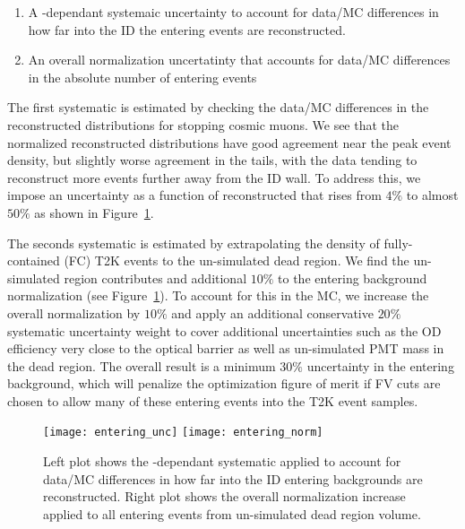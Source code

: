 \begin{enumerate}
  \item A \wall-dependant systemaic uncertainty to account for data/MC differences in 
    how far into the ID the entering events are reconstructed.
  \item An overall normalization uncertatinty that accounts for data/MC
    differences in the absolute number of entering events
\end{enumerate}

The first systematic is estimated by checking the data/MC differences in the
reconstructed \wall distributions for stopping cosmic muons. We see that the
normalized reconstructed \wall distributions have good agreement near the peak
event density, but slightly worse agreement in the tails, with the data tending
to reconstruct more events further away from the ID wall.  To address this, we
impose an uncertainty as a function of reconstructed \wall that rises from
$4\%$ to almost $50\%$ as shown in Figure~\ref{fig:enteringerr}.

The seconds systematic is estimated by extrapolating the density of
fully-contained (FC) T2K events to the un-simulated dead region.  We find the
un-simulated region contributes and additional $10\%$ to the entering
background normalization (see Figure~\ref{fig:enteringerr}).  To account for
this in the MC, we increase the overall normalization by $10\%$ and apply an
additional conservative $20\%$ systematic uncertainty weight to cover
additional uncertainties such as the OD efficiency very close to the optical barrier
as well as un-simulated PMT mass in the dead region.  The overall result is a
minimum $30\%$ uncertainty in the entering background, which will penalize the
optimization figure of merit if FV cuts are chosen to allow many of these
entering events into the T2K event samples.

\begin{figure}[h!t]
  \begin{center}
    \texttt{[image: entering\_unc]}
    \texttt{[image: entering\_norm]}
  \end{center}
  \caption{Left plot shows the \wall-dependant systematic applied to account
  for data/MC differences in how far into the ID entering backgrounds are
  reconstructed.  Right plot shows the overall normalization increase applied
  to all entering events from un-simulated dead region volume.}
  \label{fig:enteringerr}
\end{figure}






